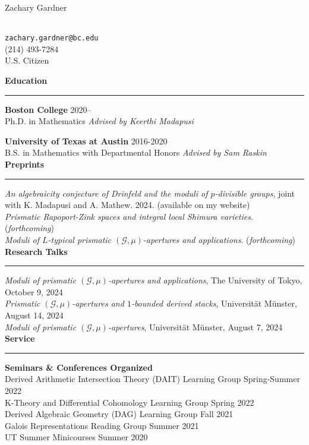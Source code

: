 \documentclass[11pt]{article}
\newenvironment{mysection}{
\color{mygreen}\bfseries\large
}
{
\\ \rule{\textwidth}{1pt}\hspace{-.25em}
} %
\begin{document}
\begin{center}
\begin{LARGE}Zachary Gardner\end{LARGE} \\
\vspace{1em}
\texttt{zachary.gardner@bc.edu} \\
(214) 493-7284 \\
U.S. Citizen \\
\end{center}

\begin{mysection}Education\end{mysection}
\textbf{Boston College} \hfill 2020-- \\
Ph.D. in Mathematics \hfill \textit{Advised by Keerthi Madapusi}

\textbf{University of Texas at Austin} \hfill 2016-2020 \\
B.S. in Mathematics with Departmental Honors \hfill \textit{Advised by Sam Raskin} \\

\begin{mysection}Preprints\end{mysection}
\!\!\textit{An algebraicity conjecture of Drinfeld and the moduli of $p$-divisible groups}, joint with K. Madapusi and A. Mathew. 2024. (available on my website) \\
\textit{Prismatic Rapoport-Zink spaces and integral local Shimura varieties}. (\textit{forthcoming}) \\
\textit{Moduli of $L$-typical prismatic $(\mathcal{G},\mu)$-apertures and applications}. (\textit{forthcoming}) \\

\begin{mysection}Research Talks\end{mysection}
\textit{Moduli of prismatic $(\mathcal{G},\mu)$-apertures and applications}, The University of Tokyo, October 9, 2024 \\
\textit{Prismatic $(\mathcal{G},\mu)$-apertures and $1$-bounded derived stacks}, Universit\"{a}t M\"{u}nster, August 14, 2024 \\
\textit{Moduli of prismatic $(\mathcal{G},\mu)$-apertures}, Universit\"{a}t M\"{u}nster, August 7, 2024 \\

\begin{mysection}Service \end{mysection}
\textbf{Seminars \& Conferences Organized} \\
Derived Arithmetic Intersection Theory (DAIT) Learning Group \hfill Spring-Summer 2022 \\
K-Theory and Differential Cohomology Learning Group \hfill Spring 2022 \\
Derived Algebraic Geometry (DAG) Learning Group \hfill Fall 2021 \\
Galois Representations Reading Group \hfill Summer 2021 \\
UT Summer Minicourses \hfill Summer 2020
\end{document}
